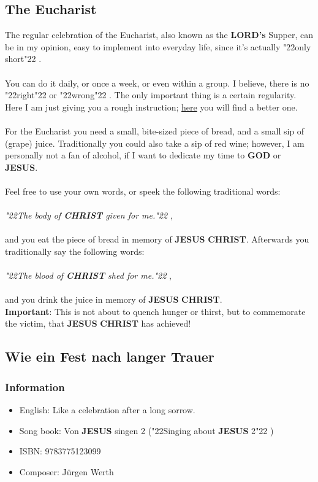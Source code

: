 \documentclass[12pt,a5paper]{article}
\newcommand{\Christ}[0]{\textbf{CHRIST}}
\newcommand{\God}[0]{\textbf{GOD}}
\newcommand{\Jesus}[0]{\textbf{JESUS}}
\newcommand{\Lords}[0]{\textbf{LORD's}}
\newcommand{\q}[1]{\char"22{#1}\char"22 }
\begin{document}
	\subsection{The Eucharist}
		The regular celebration of the Eucharist,
		also known as the {\Lords} Supper,
		can be
		in my opinion,
		easy to implement into everyday life,
		since it's actually \q{only short}.
		\\
		\\
		You can do it daily,
		or once a week,
		or even within a group.
		I believe,
		there is no \q{right} or \q{wrong}.
		The only important thing is a certain regularity.
		Here I am just giving you a rough instruction;
		\href{https://www.youtube.com/watch?v=8iCgvvpLhvM}{here} you will find a better one.
		\\
		\\
		For the Eucharist you need a small,
		bite-sized piece of bread,
		and a small sip of (grape) juice.
		Traditionally you could also take a sip of red wine;
		however,
		I am personally not a fan of alcohol,
		if I want to dedicate my time to {\God} or {\Jesus}.
		\\
		\\
		Feel free to use your own words,
		or speek the following traditional words:
		\\
		\\
		\textit{\q{The body of {\Christ} given for me.}},
		\\
		\\
		and you eat the piece of bread in memory of {\Jesus} {\Christ}.
		Afterwards you traditionally say the following words:
		\\
		\\
		\textit{\q{The blood of {\Christ} shed for me.}},
		\\
		\\
		and you drink the juice in memory of {\Jesus} {\Christ}.
		\\
		\textbf{Important}: 
		This is not about
		to quench hunger or thirst,
		but to commemorate the victim,
		that {\Jesus} {\Christ} has achieved!

	\subsection{Wie ein Fest nach langer Trauer}
		\subsubsection{Information}
			\begin{itemize}[nosep]
				\item English: Like a celebration after a long sorrow.
				\item Song book: Von {\Jesus} singen 2 (\q{Singing about {\Jesus} 2})
				\item ISBN: 9783775123099
				\item Composer: J\"urgen Werth
			\end{itemize}
		
\end{document}
